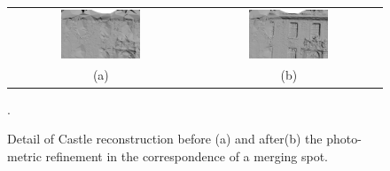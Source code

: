 \begin{figure}[tpb]
\centering
\begin{tabular}{cc}
\includegraphics[width=0.45\textwidth]{./img/ch-incr-dens/castle09}&
\includegraphics[width=0.45\textwidth]{./img/ch-incr-dens/castle10}\\
(a)&(b)
\end{tabular}
\caption{Detail of Castle reconstruction before (a) and after(b) the photo-metric refinement in the correspondence of a merging spot.}.
\label{fig:detailcastle2}
\end{figure}



